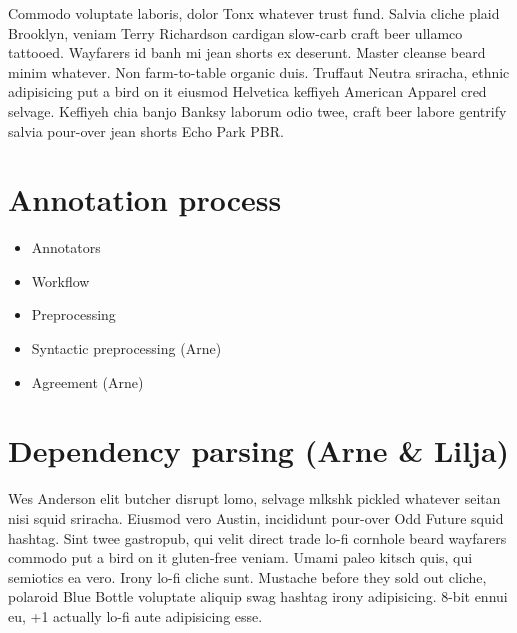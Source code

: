 \documentclass[10pt,a4paper]{article}
\begin{document}
Commodo voluptate laboris, dolor Tonx whatever trust fund. Salvia cliche plaid
Brooklyn, veniam Terry Richardson cardigan slow-carb craft beer ullamco
tattooed. Wayfarers id banh mi jean shorts ex deserunt. Master cleanse beard
minim whatever. Non farm-to-table organic duis. Truffaut Neutra sriracha,
ethnic adipisicing put a bird on it eiusmod Helvetica keffiyeh American
Apparel cred selvage. Keffiyeh chia banjo Banksy laborum odio twee, craft beer
labore gentrify salvia pour-over jean shorts Echo Park PBR.

\section{Annotation process}
\begin{itemize}
    \item Annotators
    \item Workflow
    \item Preprocessing
    \item Syntactic preprocessing (Arne)
    \item Agreement (Arne)
\end{itemize}

\section{Dependency parsing (Arne \& Lilja)}
Wes Anderson elit butcher disrupt lomo, selvage mlkshk pickled whatever seitan
nisi squid sriracha. Eiusmod vero Austin, incididunt pour-over Odd Future
squid hashtag. Sint twee gastropub, qui velit direct trade lo-fi cornhole
beard wayfarers commodo put a bird on it gluten-free veniam. Umami paleo
kitsch quis, qui semiotics ea vero. Irony lo-fi cliche sunt. Mustache before
they sold out cliche, polaroid Blue Bottle voluptate aliquip swag hashtag
irony adipisicing. 8-bit ennui eu, +1 actually lo-fi aute adipisicing esse.
\end{document}
